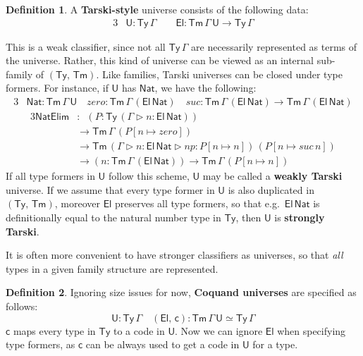 \documentclass[12pt,a4paper,twoside,openany]{book}
\theoremstyle{remark}
\theoremstyle{definition}
\newtheorem{mydefinition}{Definition}
\newcommand{\mi}[1]{\mathit{#1}}
\newcommand{\ms}[1]{\mathsf{#1}}
\newcommand{\Tm}{\mathsf{Tm}}
\newcommand{\Ty}{\mathsf{Ty}}
\newcommand{\U}{\mathsf{U}}
\newcommand{\El}{\mathsf{El}}
\newcommand{\ext}{\triangleright}
\newcommand{\Nat}{\ms{Nat}}
\begin{document}
\begin{mydefinition} A \textbf{Tarski-style} universe consists of
the following data:
\begin{alignat*}{3}
  & \U : \Ty\,\Gamma\hspace{2em}\El : \Tm\,\Gamma\,\U \to \Ty\,\Gamma
\end{alignat*}
\end{mydefinition}
This is a weak classifier, since not all $\Ty\,\Gamma$ are necessarily
represented as terms of the universe. Rather, this kind of universe can be
viewed as an internal sub-family of $(\Ty,\,\Tm)$. Like families, Tarski
universes can be closed under type formers. For instance, if $\U$ has $\Nat$,
we have the following:
\begin{alignat*}{3}
  &\Nat : \Tm\,\Gamma\,\U
    \hspace{1em}\mi{zero} : \Tm\,\Gamma\,(\El\,\Nat)
    \hspace{1em}\mi{suc} : \Tm\,\Gamma\,(\El\,\Nat) \to \Tm\,\Gamma\,(\El\,\Nat)
\end{alignat*}
\vspace{-2em}
\begin{alignat*}{3}
  \ms{NatElim} &:\,\,\,(P : \Ty\,(\Gamma\ext n : \El\,\Nat))\\
  &\to \Tm\,\Gamma\,(P[n \mapsto \mi{zero}])\\
  &\to \Tm\,(\Gamma\ext n : \El\,\Nat \ext \mi{np} : P[n \mapsto n])\,(P[n \mapsto \mi{suc}\,n]) \\
  &\to (n : \Tm\,\Gamma\,(\El\,\Nat)) \to \Tm\,\Gamma\,(P[n \mapsto n])
\end{alignat*}
If all type formers in $\U$ follow this scheme, $\U$ may be called a
\textbf{weakly Tarski} universe. If we assume that every type former in $\U$ is
also duplicated in $(\Ty,\,\Tm)$, moreover $\El$ preserves all type formers, so
that e.g.\ $\El\,\Nat$ is definitionally equal to the natural number type in
$\Ty$, then $\U$ is \textbf{strongly Tarski}.

It is often more convenient to have stronger classifiers as universes, so that
\emph{all} types in a given family structure are represented.

\begin{mydefinition}
Ignoring size issues for now, \textbf{Coquand universes} \cite{TODO} are
specified as follows:
\[
  \U : \Ty\,\Gamma\hspace{1em} (\El,\,\ms{c}) : \Tm\,\Gamma\,\U \simeq \Ty\,\Gamma
\]
$\ms{c}$ maps every type in $\Ty$ to a code in $\U$. Now we can ignore $\El$
when specifying type formers, as $\ms{c}$ can be always used to get a code in
$\U$ for a type.
\end{mydefinition}
\end{document}
